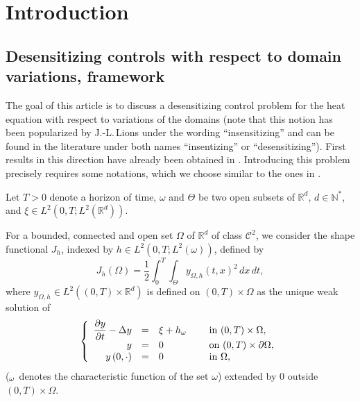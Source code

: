 \documentclass[11pt]{article}
\makeatletter
\newcommand{\Subsection}{\subsection}
\numberwithin{equation}{section}
\DeclareRobustCommand{\mathbbm}[1]{\csname jepbb@#1\endcsname}
\newcommand\R{{\mathbb R}}
\theoremstyle{definition}
\makeatother
\begin{document}
\section{Introduction}

\Subsection{Desensitizing controls with respect to domain variations, framework}
The goal of this article is to discuss a desensitizing control problem for the heat equation with respect to variations of the domains (note that this notion has been popularized by J.-L.\,Lions \cite{Lions-1990} under the wording ``insensitizing'' and can be found in the literature under both names ``insentizing'' or ``desensitizing''). First results in this direction have already been obtained in \cite{Lissy-Privat-Simpore}. Introducing this problem precisely requires some notations, which we choose similar to the ones in \cite{Lissy-Privat-Simpore}.

Let $T>0$ denote a horizon of time, $\omega$ and $\Theta$ be two open subsets of $\R^d$, $d\in\mathbb N^*$, and $\xi \in L^2(0,T; L^2(\R^d))$.

For a bounded, connected and open set $\Omega$ of $\mathbb{R}^d$ of class $\mathscr{C}^2$, we consider the shape functional $J_h$, indexed by $h \in L^2(0,T; L^2(\omega))$, defined by
\begin{equation}
\label{def-J}
J_h(\Omega) = \dfrac{1}{2}\int_{0}^{T} \int_{\Theta}y_{\Omega,h}(t,x)^{2}\, dx\,dt,
\end{equation}
where $y_{\Omega,h}\in L^2((0,T)\times \mathbb R^d)$ is defined on $(0,T)\times\Omega$ as the unique weak solution of
\begin{equation}
\label{y-Omega-h}
\left\{
\begin{array}{rcll}
\dfrac{\partial y}{\partial t}-\Delta y &=&\xi +h\mathbbm{1}_{\omega}\quad&\text{ in }(0,T) \times \Omega,
\\
y&=& 0 &\text{ on }(0,T) \times \partial \Omega,
\\
y\left(0,\cdot\right) &=& 0 &\text{ in }\Omega,
\end{array}
\right.
\end{equation}
($\mathbbm{1}_\omega$ denotes the characteristic function of the set $\omega$) extended by $0$ outside $(0,T) \times \Omega$.
\end{document}
